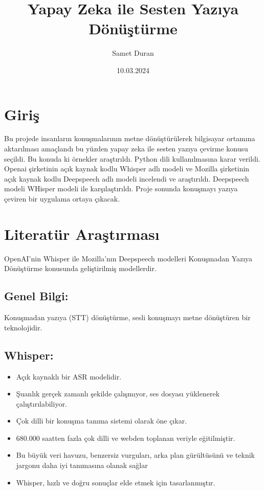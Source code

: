 \documentclass{article}
\title{Yapay Zeka ile Sesten Yazıya Dönüştürme}
\author{Samet Duran}
\date{10.03.2024}
\begin{document}
	\maketitle
	\newpage
	\section{Giriş}
	Bu projede insanların konuşmalarının metne dönüştürülerek bilgisayar ortamına aktarılması amaçlandı bu yüzden yapay zeka ile sesten yazıya çevirme konusu seçildi. Bu konuda ki örnekler araştırıldı. Python dili kullanılmasına karar verildi. Openai şirketinin açık kaynak kodlu Whisper adlı modeli ve Mozilla şirketinin açık kaynak kodlu Deepspeech adlı modeli incelendi ve araştırıldı. Deepspeech modeli WHisper modeli ile karşılaştırıldı. Proje sonunda konuşmayı yazıya çeviren bir uygulama ortaya çıkacak.
	 
	\section{Literatür Araştırması}
	OpenAI'nin Whisper ile Mozilla'nın Deepspeech modelleri Konuşmadan Yazıya Dönüştürme konusunda geliştirilmiş modellerdir.
	
	\subsection{Genel Bilgi:}
	
	Konuşmadan yazıya (STT) dönüştürme, sesli konuşmayı metne dönüştüren bir teknolojidir.
	
	\subsection{Whisper:}
	\begin{itemize}
		\item Açık kaynaklı bir ASR modelidir.
		\item Şuanlık gerçek zamanlı şekilde çalışmıyor, ses dosyası yüklenerek çalıştırılabiliyor.
		\item Çok dilli bir konuşma tanıma sistemi olarak öne çıkar.
		\item 680.000 saatten fazla çok dilli ve webden toplanan veriyle eğitilmiştir.
		\item Bu büyük veri havuzu, benzersiz vurguları, arka plan gürültüsünü ve teknik jargonu daha iyi tanımasına olanak sağlar
		\item Whisper, hızlı ve doğru sonuçlar elde etmek için tasarlanmıştır.
	\end{itemize}
	
\end{document}
